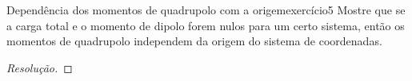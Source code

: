 \begin{exercício}{Dependência dos momentos de quadrupolo com a origem}{exercício5}
    Mostre que se a carga total e o momento de dipolo forem nulos para um certo sistema, então os momentos de quadrupolo independem da origem do sistema de coordenadas.
\end{exercício}
\begin{proof}[Resolução]

\end{proof}
